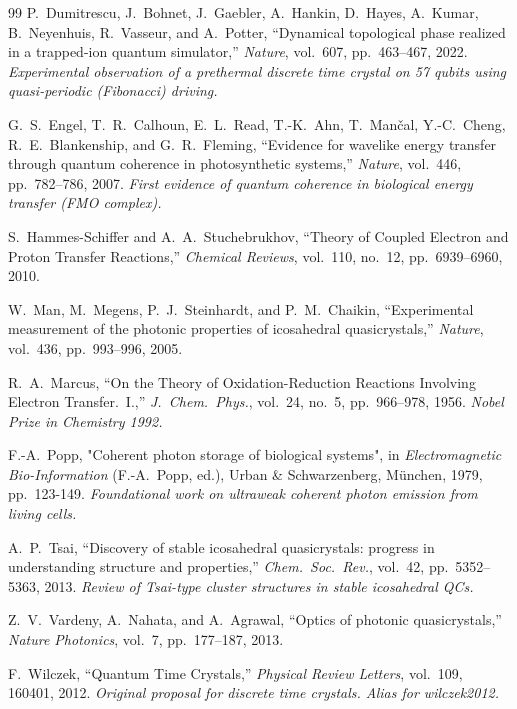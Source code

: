 \begin{thebibliography}{99}
P.~Dumitrescu, J.~Bohnet, J.~Gaebler, A.~Hankin, D.~Hayes, A.~Kumar,
B.~Neyenhuis, R.~Vasseur, and A.~Potter,
``Dynamical topological phase realized in a trapped-ion quantum simulator,''
\emph{Nature}, vol.~607, pp.~463--467, 2022.
\textit{Experimental observation of a prethermal discrete time crystal on 57 qubits
using quasi-periodic (Fibonacci) driving.}

G.~S.~Engel, T.~R.~Calhoun, E.~L.~Read, T.-K.~Ahn, T.~Man\v{c}al, Y.-C.~Cheng,
R.~E.~Blankenship, and G.~R.~Fleming,
``Evidence for wavelike energy transfer through quantum coherence in photosynthetic systems,''
\emph{Nature}, vol.~446, pp.~782--786, 2007.
\textit{First evidence of quantum coherence in biological energy transfer (FMO complex).}

S.~Hammes-Schiffer and A.~A.~Stuchebrukhov,
``Theory of Coupled Electron and Proton Transfer Reactions,''
\emph{Chemical Reviews}, vol.~110, no.~12, pp.~6939--6960, 2010.

W.~Man, M.~Megens, P.~J.~Steinhardt, and P.~M.~Chaikin,
``Experimental measurement of the photonic properties of icosahedral quasicrystals,''
\emph{Nature}, vol.~436, pp.~993--996, 2005.

R.~A.~Marcus,
``On the Theory of Oxidation-Reduction Reactions Involving Electron Transfer.\ I.,''
\emph{J.\ Chem.\ Phys.}, vol.~24, no.~5, pp.~966--978, 1956.
\textit{Nobel Prize in Chemistry 1992.}

F.-A.~Popp,
"Coherent photon storage of biological systems",
in \emph{Electromagnetic Bio-Information} (F.-A.~Popp, ed.),
Urban \& Schwarzenberg, M\"{u}nchen, 1979, pp.~123-149.
\textit{Foundational work on ultraweak coherent photon emission from living cells.}

A.~P.~Tsai,
``Discovery of stable icosahedral quasicrystals: progress in understanding structure and properties,''
\emph{Chem.\ Soc.\ Rev.}, vol.~42, pp.~5352--5363, 2013.
\textit{Review of Tsai-type cluster structures in stable icosahedral QCs.}

Z.~V.~Vardeny, A.~Nahata, and A.~Agrawal,
``Optics of photonic quasicrystals,''
\emph{Nature Photonics}, vol.~7, pp.~177--187, 2013.

F.~Wilczek,
``Quantum Time Crystals,''
\emph{Physical Review Letters}, vol.~109, 160401, 2012.
\textit{Original proposal for discrete time crystals. Alias for wilczek2012.}



\end{thebibliography}
